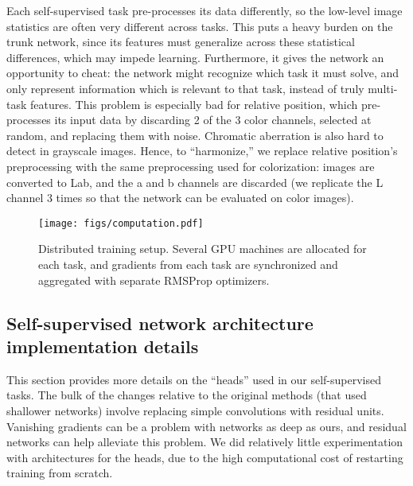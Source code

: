 \documentclass[10pt,twocolumn,letterpaper]{article}
\begin{document}
Each self-supervised task pre-processes its data differently, so the low-level image statistics are often very different across tasks.
This puts a heavy burden on the trunk network, since its features must generalize across these statistical differences, which may impede learning.
Furthermore, it gives the network an opportunity to cheat: the network might recognize which task it must solve, and only represent information which is relevant to that task, instead of truly multi-task features.
This problem is especially bad for relative position, which pre-processes its input data by discarding 2 of the 3 color channels, selected at random, and replacing them with noise.
Chromatic aberration is also hard to detect in grayscale images.
Hence, to ``harmonize,'' we replace relative position's preprocessing with the same preprocessing used for colorization: images are converted to Lab, and the a and b channels are discarded (we replicate the L channel 3 times so that the network can be evaluated on color images).


\begin{figure}[t]
\begin{center}
   \texttt{[image: figs/computation.pdf]}
\end{center}

   \caption{
   Distributed training setup.  
   Several GPU machines are allocated for each task, and gradients from each task are synchronized and aggregated with separate RMSProp optimizers.
   }
   
\label{fig:net_training}
\end{figure}

\subsection{Self-supervised network architecture implementation details}
This section provides more details on the ``heads'' used in our self-supervised tasks.
The bulk of the changes relative to the original methods (that used shallower networks) involve replacing simple convolutions with residual units.  
Vanishing gradients can be a problem with networks as deep as ours, and residual networks can help alleviate this problem.  
We did relatively little experimentation with architectures for the heads, due to the high computational cost of restarting training from scratch.
\end{document}
